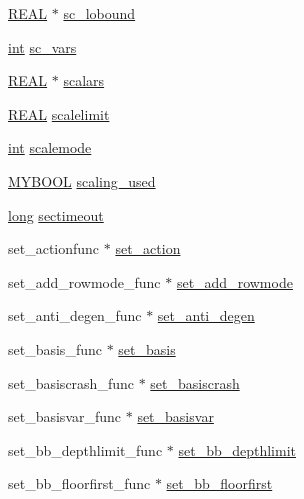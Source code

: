 \begin{DoxyCompactItemize}
\item 
\hyperlink{lp__lib_8h_a92bd5e363d131fa73669358edb232dce}{R\+E\+AL} $\ast$ \hyperlink{struct__lprec_a9a581e6b07c2a639589c44d4c9381c36}{sc\+\_\+lobound}
\item 
\hyperlink{lp__lib_8h_adeb9ec6400320e4923ac9d836d509ddb}{int} \hyperlink{struct__lprec_a88d028cca3fe1573706e6db36bfa7485}{sc\+\_\+vars}
\item 
\hyperlink{lp__lib_8h_a92bd5e363d131fa73669358edb232dce}{R\+E\+AL} $\ast$ \hyperlink{struct__lprec_a24dfc40842ef6b3752d84d03d394345a}{scalars}
\item 
\hyperlink{lp__lib_8h_a92bd5e363d131fa73669358edb232dce}{R\+E\+AL} \hyperlink{struct__lprec_a0953846900375f18ccc84b348275dc3d}{scalelimit}
\item 
\hyperlink{lp__lib_8h_adeb9ec6400320e4923ac9d836d509ddb}{int} \hyperlink{struct__lprec_a85dde41db7ff4247ad17f54dfa5b81d1}{scalemode}
\item 
\hyperlink{lp__lib_8h_aad848328fb3018217ac9f01d97b6bd88}{M\+Y\+B\+O\+OL} \hyperlink{struct__lprec_a6d9f74524c3efa8d484569290c758ae3}{scaling\+\_\+used}
\item 
\hyperlink{lp__lib_8h_ad3500e0f98a49bb08992451a297ce6a6}{long} \hyperlink{struct__lprec_a004fe5f6734b460817c42407db43b241}{sectimeout}
\item 
set\+\_\+actionfunc $\ast$ \hyperlink{struct__lprec_a8f5f991e1508e9ec7ad21e97d4cd9780}{set\+\_\+action}
\item 
set\+\_\+add\+\_\+rowmode\+\_\+func $\ast$ \hyperlink{struct__lprec_a817d631f1d35ff52f7dcdd97ed5229ac}{set\+\_\+add\+\_\+rowmode}
\item 
set\+\_\+anti\+\_\+degen\+\_\+func $\ast$ \hyperlink{struct__lprec_a9d5cd8ed5b625f3783b7b576aa040f90}{set\+\_\+anti\+\_\+degen}
\item 
set\+\_\+basis\+\_\+func $\ast$ \hyperlink{struct__lprec_afd4d554e96dd460ba7a54ee0f2c2fb35}{set\+\_\+basis}
\item 
set\+\_\+basiscrash\+\_\+func $\ast$ \hyperlink{struct__lprec_affefb7235a11551b9e3014700d1af322}{set\+\_\+basiscrash}
\item 
set\+\_\+basisvar\+\_\+func $\ast$ \hyperlink{struct__lprec_a106c7a613193833d1a658f791834b029}{set\+\_\+basisvar}
\item 
set\+\_\+bb\+\_\+depthlimit\+\_\+func $\ast$ \hyperlink{struct__lprec_a77cd1064c5948f98718cabf34602f1f6}{set\+\_\+bb\+\_\+depthlimit}
\item 
set\+\_\+bb\+\_\+floorfirst\+\_\+func $\ast$ \hyperlink{struct__lprec_acd37f1f7efde30dc48f293b18e021ac6}{set\+\_\+bb\+\_\+floorfirst}

\end{DoxyCompactItemize}
